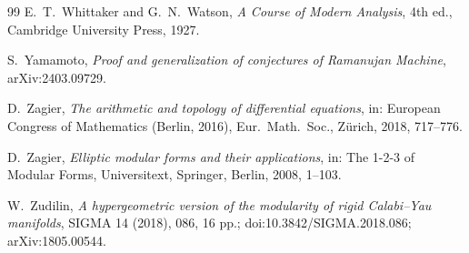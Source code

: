 \documentclass[11pt]{amsart}
\theoremstyle{definition}
\theoremstyle{remark}
\numberwithin{equation}{section}
\begin{document}
\begin{thebibliography}{99}
 E.~T.~Whittaker and G.~N.~Watson, \emph{A Course of Modern Analysis}, 4th ed., Cambridge University Press, 1927.

 S.~Yamamoto, \emph{Proof and generalization of conjectures of Ramanujan Machine}, arXiv:2403.09729.

 D.~Zagier, \emph{The arithmetic and topology of differential equations}, in: European Congress of Mathematics (Berlin, 2016), Eur.\ Math.\ Soc., Z\"urich, 2018, 717--776.

 D.~Zagier, \emph{Elliptic modular forms and their applications}, in: The 1-2-3 of Modular Forms, Universitext, Springer, Berlin, 2008, 1--103.

 W.~Zudilin, \emph{A hypergeometric version of the modularity of rigid Calabi--Yau manifolds}, SIGMA 14 (2018), 086, 16 pp.; doi:10.3842/SIGMA.2018.086; arXiv:1805.00544.

\end{thebibliography}
\end{document}
